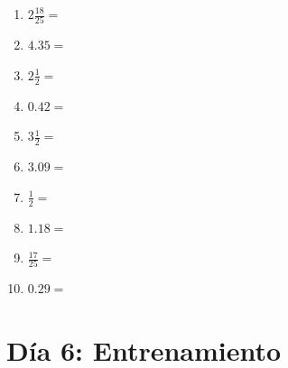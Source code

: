 \documentclass[12pt]{article}
\begin{document}
\begin{enumerate}
\item \large $ 2 \frac{18}{25} = $ \vspace{1.5cm}
\item \large $ 4.35 = $ \vspace{1.5cm}
\item \large $ 2 \frac{1}{2} = $ \vspace{1.5cm}
\item \large $ 0.42 = $ \vspace{1.5cm}
\item \large $ 3 \frac{1}{2} = $ \vspace{1.5cm}
\item \large $ 3.09 = $ \vspace{1.5cm}
\item \large $ \frac{1}{2} = $ \vspace{1.5cm}
\item \large $ 1.18 = $ \vspace{1.5cm}
\item \large $ \frac{17}{25} = $ \vspace{1.5cm}
\item \large $ 0.29 = $ \vspace{1.5cm}
\end{enumerate}\newpage
\section*{Día 6: Entrenamiento}
\end{document}
